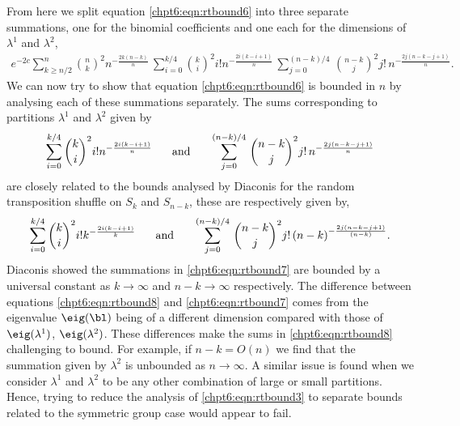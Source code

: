 \documentclass[11pt]{report}
\begin{document}
From here we split equation \eqref{chpt6:eqn:rtbound6} into three separate summations, one for the binomial coefficients and one each for the dimensions of $\lambda^{1}$ and $\lambda^{2}$,
\begin{eqnarray}
e^{-2c} \sum_{k\geq n/2}^{n}  {n \choose k}^{2}  n^{-\frac{2k(n-k)}{n}}\, \sum_{i=0}^{k/4} {k \choose i}^{2} i! n^{- \frac{2i(k-i+1)}{n}}\, \sum_{j=0}^{(n-k)/4}  \, {n-k \choose j}^{2} j! \, n^{ - \frac{2j(n-k-j+1)}{n}}. \nonumber
\end{eqnarray}
We can now try to show that equation \eqref{chpt6:eqn:rtbound6} is bounded in $n$ by analysing each of these summations separately. The sums corresponding to partitions $\lambda^{1}$ and $\lambda^{2}$ given by 
\begin{eqnarray}
\sum_{i=0}^{k/4} {k \choose i}^{2} i! n^{- \frac{2i(k-i+1)}{n}} \hspace{0.5cm} \textnormal{ and }  \hspace{0.5cm} \sum_{j=0}^{(n-k)/4}  \, {n-k \choose j}^{2} j! \, n^{ - \frac{2j(n-k-j+1)}{n}} \label{chpt6:eqn:rtbound8}
\end{eqnarray}
are closely related to the bounds analysed by Diaconis \cite[Chapter 3D]{Diaconis1988} for the random transposition shuffle on $S_{k}$ and $S_{n-k}$, these are respectively given by,
\begin{eqnarray}
\sum_{i=0}^{k/4} {k \choose i}^{2} i! k^{- \frac{2i(k-i+1)}{k}} \hspace{0.5cm} \textnormal{ and }  \hspace{0.5cm} \sum_{j=0}^{(n-k)/4}  \, {n-k \choose j}^{2} j! \, (n-k)^{ - \frac{2j(n-k-j+1)}{(n-k)}}. \label{chpt6:eqn:rtbound7}
\end{eqnarray}
Diaconis showed the summations in \eqref{chpt6:eqn:rtbound7} are bounded by a universal constant as $k \to \infty$ and $n-k \to \infty$ respectively. The difference between equations \eqref{chpt6:eqn:rtbound8} and \eqref{chpt6:eqn:rtbound7} comes from the eigenvalue $\eig(\bl)$ being of a different dimension compared with those of $\eig(\lambda^{1})$, $\eig(\lambda^{2})$. 
These differences make the sums in \eqref{chpt6:eqn:rtbound8} challenging to bound. For example, if $n-k = O(n)$ we find that the summation given by $\lambda^{2}$ is unbounded as $n\to \infty$. 
A similar issue is found when we consider $\lambda^{1}$ and $\lambda^{2}$ to be any other combination of large or small partitions. Hence, trying to reduce the analysis of \eqref{chpt6:eqn:rtbound3} to separate bounds related to the  symmetric group case would appear to fail.
\end{document}
